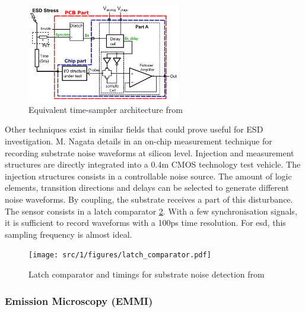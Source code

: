 \begin{figure}[!h]
  \centering
  \includegraphics[width=0.6\textwidth]{src/1/figures/architecture_equivalent_time_sampler.png}
  \caption{Equivalent time-sampler architecture from \cite{eq-time-sampling}}
  \label{fig:eq-time-sampler-architecture}
\end{figure}

Other techniques exist in similar fields that could prove useful for ESD investigation.
M. Nagata details in \cite{substrate-noise-measurement} an on-chip measurement technique for recording substrate noise waveforms at silicon level.
Injection and measurement structures are directly integrated into a 0.4\textmu{}m CMOS technology test vehicle.
The injection structures consists in a controllable noise source.
The amount of logic elements, transition directions and delays can be selected to generate different noise waveforms.
By coupling, the substrate receives a part of this disturbance.
The sensor consists in a latch comparator \ref{fig:noise-detect-latch-comparator}.
With a few synchronisation signals, it is sufficient to record waveforms with a 100ps time resolution.
For \gls{esd}, this sampling frequency is almost ideal.

\begin{figure}[!h]
  \centering
  \texttt{[image: src/1/figures/latch\_comparator.pdf]}
  \caption{Latch comparator and timings for substrate noise detection from \cite{}}
  \label{fig:noise-detect-latch-comparator}
\end{figure}


\subsubsection{Emission Microscopy (EMMI)}

